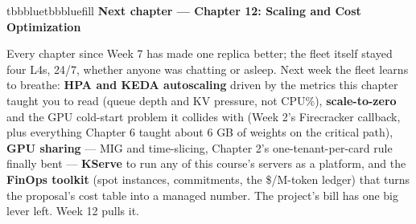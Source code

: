 \vspace{5.0pt}

\begin{calloutbox}{tbbblue}{tbbbluefill}
{\normalsize\bfseries\color{tbbblue}Next chapter — Chapter 12: Scaling and Cost Optimization}\par\vspace{3pt}
Every chapter since Week 7 has made one replica better; the fleet itself stayed four L4s, 24/7, whether anyone was chatting or asleep. Next week the fleet learns to breathe: \textbf{HPA and KEDA autoscaling} driven by the metrics this chapter taught you to read (queue depth and KV pressure, not CPU\%), \textbf{scale-to-zero} and the GPU cold-start problem it collides with (Week 2's Firecracker callback, plus everything Chapter 6 taught about 6 GB of weights on the critical path), \textbf{GPU sharing} — MIG and time-slicing, Chapter 2's one-tenant-per-card rule finally bent — \textbf{KServe} to run any of this course's servers as a platform, and the \textbf{FinOps toolkit} (spot instances, commitments, the \$/M-token ledger) that turns the proposal's cost table into a managed number. The project's bill has one big lever left. Week 12 pulls it.
\end{calloutbox}
